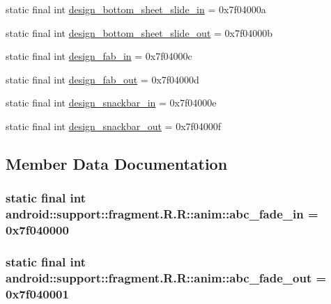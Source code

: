 \begin{CompactItemize}
\item 
static final int \hyperlink{classandroid_1_1support_1_1fragment_1_1_r_1_1anim_2e0bb78d6f5133201752863ef73cb7f5}{design\_\-bottom\_\-sheet\_\-slide\_\-in} = 0x7f04000a
\item 
static final int \hyperlink{classandroid_1_1support_1_1fragment_1_1_r_1_1anim_98a04a43a861bacc000a996ecc2d3804}{design\_\-bottom\_\-sheet\_\-slide\_\-out} = 0x7f04000b
\item 
static final int \hyperlink{classandroid_1_1support_1_1fragment_1_1_r_1_1anim_86ca270a61b8c983ea606c79da6979e6}{design\_\-fab\_\-in} = 0x7f04000c
\item 
static final int \hyperlink{classandroid_1_1support_1_1fragment_1_1_r_1_1anim_3bf54f050ef4c3db0827d207c5ed1755}{design\_\-fab\_\-out} = 0x7f04000d
\item 
static final int \hyperlink{classandroid_1_1support_1_1fragment_1_1_r_1_1anim_621e1d675dead7dc09a6215c11300062}{design\_\-snackbar\_\-in} = 0x7f04000e
\item 
static final int \hyperlink{classandroid_1_1support_1_1fragment_1_1_r_1_1anim_248c9efb4f955e21c8da0dd6eaedee48}{design\_\-snackbar\_\-out} = 0x7f04000f
\end{CompactItemize}


\subsection{Member Data Documentation}
\hypertarget{classandroid_1_1support_1_1fragment_1_1_r_1_1anim_8e5f1a0131d7980ff6dcc2ba6da9fcda}{
\subsubsection[{abc\_\-fade\_\-in}]{\setlength{\rightskip}{0pt plus 5cm}static final int android::support::fragment.R.R::anim::abc\_\-fade\_\-in = 0x7f040000}}
\label{classandroid_1_1support_1_1fragment_1_1_r_1_1anim_8e5f1a0131d7980ff6dcc2ba6da9fcda}


\hypertarget{classandroid_1_1support_1_1fragment_1_1_r_1_1anim_780f1f65647cd9bd5fbda0c47f3d12c1}{
\subsubsection[{abc\_\-fade\_\-out}]{\setlength{\rightskip}{0pt plus 5cm}static final int android::support::fragment.R.R::anim::abc\_\-fade\_\-out = 0x7f040001}}
\label{classandroid_1_1support_1_1fragment_1_1_r_1_1anim_780f1f65647cd9bd5fbda0c47f3d12c1}


